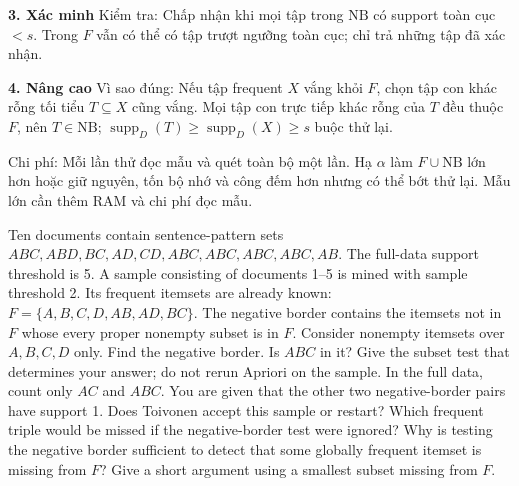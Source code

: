 \documentclass[10pt,a4paper,twocolumn]{article}
\newcommand{\key}[1]{#1:\enspace}
\newcommand{\unitheading}[2]{%
  \par\addvspace{1pt}\noindent\textbf{#1. #2}\enspace}
\newcommand{\unitverification}{\unitheading{3}{Xác minh}}
\newcommand{\unitadvanced}{\unitheading{4}{Nâng cao}}
\begin{document}

\unitverification
\key{Kiểm tra} Chấp nhận khi mọi tập trong $\mathrm{NB}$ có support toàn cục $<s$. Trong $F$ vẫn có thể có tập trượt ngưỡng toàn cục; chỉ trả những tập đã xác nhận.

\unitadvanced
\key{Vì sao đúng} Nếu tập frequent $X$ vắng khỏi $F$, chọn tập con khác rỗng tối tiểu $T\subseteq X$ cũng vắng. Mọi tập con trực tiếp khác rỗng của $T$ đều thuộc $F$, nên $T\in\mathrm{NB}$; $\operatorname{supp}_D(T)\ge\operatorname{supp}_D(X)\ge s$ buộc thử lại.

\key{Chi phí} Mỗi lần thử đọc mẫu và quét toàn bộ một lần. Hạ $\alpha$ làm $F\cup\mathrm{NB}$ lớn hơn hoặc giữ nguyên, tốn bộ nhớ và công đếm hơn nhưng có thể bớt thử lại. Mẫu lớn cần thêm RAM và chi phí đọc mẫu.

Ten documents contain sentence-pattern sets $ABC,ABD,BC,AD,CD,ABC,ABC,ABC,ABC,AB$. The full-data support threshold is 5. A sample consisting of documents 1--5 is mined with sample threshold 2. Its frequent itemsets are already known: $F=\{A,B,C,D,AB,AD,BC\}$. The negative border contains the itemsets not in $F$ whose every proper nonempty subset is in $F$. Consider nonempty itemsets over $A,B,C,D$ only.
 Find the negative border. Is $ABC$ in it? Give the subset test that determines your answer; do not rerun Apriori on the sample.
 In the full data, count only $AC$ and $ABC$. You are given that the other two negative-border pairs have support 1. Does Toivonen accept this sample or restart? Which frequent triple would be missed if the negative-border test were ignored?
 Why is testing the negative border sufficient to detect that some globally frequent itemset is missing from $F$? Give a short argument using a smallest subset missing from $F$.
\end{document}
